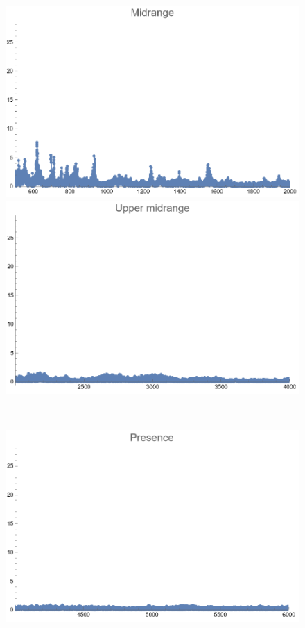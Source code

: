 \documentclass[12pt, letterpaper]{article}
\begin{document}
\begin{figure}[H]
\begin{minipage}{.3\textwidth}
  \end{minipage}
  \begin{minipage}{0.03\textwidth}\end{minipage}
  \begin{minipage}{.3\textwidth}
    \centering
    \includegraphics[width=.9\linewidth]{imgs/Cancion6/mid.png}
  \end{minipage}
  \begin{minipage}{0.03\textwidth}\end{minipage}
  \begin{minipage}{.3\textwidth}
    \centering
    \includegraphics[width=.9\linewidth]{imgs/Cancion6/upmid.png}
  \end{minipage} \medskip \\
  \begin{minipage}{.3\textwidth}
    \centering
    \includegraphics[width=.9\linewidth]{imgs/Cancion6/presence.png}

\end{minipage}
\end{figure}
\end{document}
